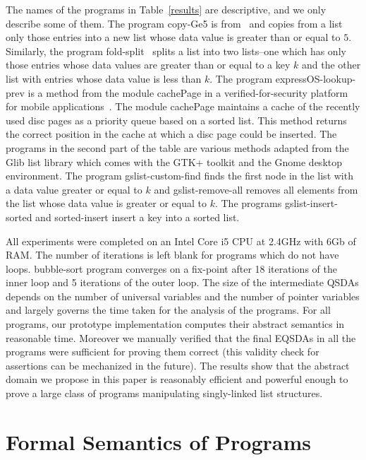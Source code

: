 \documentclass{llncs}
\newcommand{\EQSDA}{\mbox{\sc EQSDA}}
\begin{document}
The names of the programs in Table~\ref{results} are descriptive, and we only describe some of them. The program {\sc copy-Ge5} is from~\cite{celia} and copies from a list only those entries into a new list whose data value is greater than or equal to $5$. Similarly, the program {\sc fold-split}~\cite{celia} splits a list into two lists--one which has only those entries whose data values are greater than or equal to a key $k$ and the other list with entries whose data value is less than $k$. The program {\sc expressOS-lookup-prev} is a method from the module cachePage in a verified-for-security platform for mobile applications~\cite{asplos13}. The module cachePage maintains a cache of the recently used disc pages as a priority queue based on a sorted list. This method returns the correct position in the cache at which a disc page could be inserted.
The programs in the second part of the table are various methods adapted from the Glib list library which comes with the GTK+ toolkit and the Gnome desktop environment. The program {\sc gslist-custom-find} finds the first node in the list with a data value greater  or equal to $k$ and {\sc gslist-remove-all} removes all elements from the list whose data value is greater  or equal to $k$. The programs {\sc gslist-insert-sorted} and {\sc sorted-insert} insert a key into a sorted list.

All experiments were completed on an Intel Core i5 CPU at 2.4GHz with 6Gb of RAM. The number of iterations is left blank for programs which do not have loops.
{\sc bubble-sort} program converges on a fix-point after 18 iterations of the inner loop and 5 iterations of the outer loop.
The size of the intermediate QSDAs depends on the number of universal variables and  the number of pointer variables and largely governs the time taken for the analysis of the programs.
For all programs, our prototype implementation computes their abstract semantics in reasonable time.
Moreover we manually verified that the final \EQSDA s in all the programs were sufficient for proving them correct (this validity check for assertions can be mechanized in the future). The results show that the abstract domain we propose in this paper is reasonably efficient and powerful enough to prove a large class of programs manipulating singly-linked list structures.


\newpage


\newpage
\appendix

\section{Formal Semantics of Programs}\label{semantics}
\end{document}
